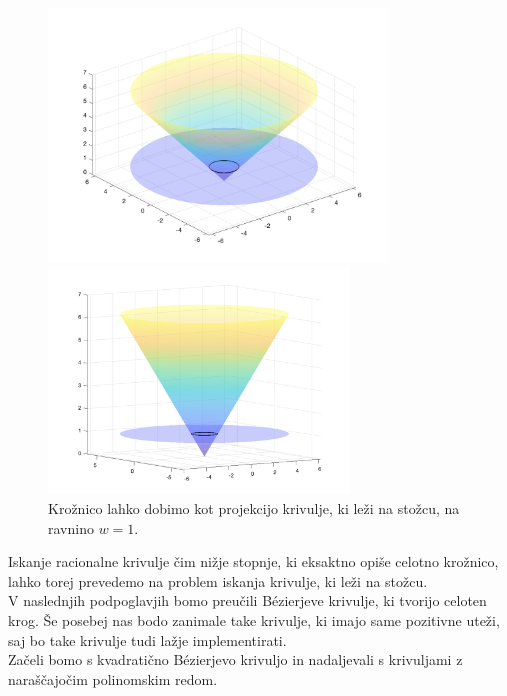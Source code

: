 \documentclass[a4paper,11pt]{article}
\theoremstyle{definition}
\theoremstyle{plain}
\begin{document}
\begin{figure}[ht!]
    \begin{minipage}{0.5\textwidth}
        \centering
        \includegraphics[width=90mm]{stozec.png}
    \end{minipage}\hfill
    \begin{minipage}{0.5\textwidth}
        \centering
        \includegraphics[width=80mm]{stozec_1.png}
    \end{minipage}\hfill
    \caption{Krožnico lahko dobimo kot projekcijo krivulje, ki leži na stožcu, na ravnino $w = 1$.}
\end{figure}
\noindent
Iskanje racionalne krivulje čim nižje stopnje, ki eksaktno opiše celotno krožnico, lahko torej prevedemo na problem iskanja krivulje, ki leži na stožcu. 
\\
V naslednjih podpoglavjih bomo preučili B\'ezierjeve krivulje, ki tvorijo celoten krog. 
Še posebej nas bodo zanimale take krivulje, ki imajo same pozitivne uteži, saj bo take krivulje tudi lažje implementirati.
\\
Začeli bomo s kvadratično B\'ezierjevo krivuljo in nadaljevali s krivuljami z naraščajočim polinomskim redom.

\end{document}

